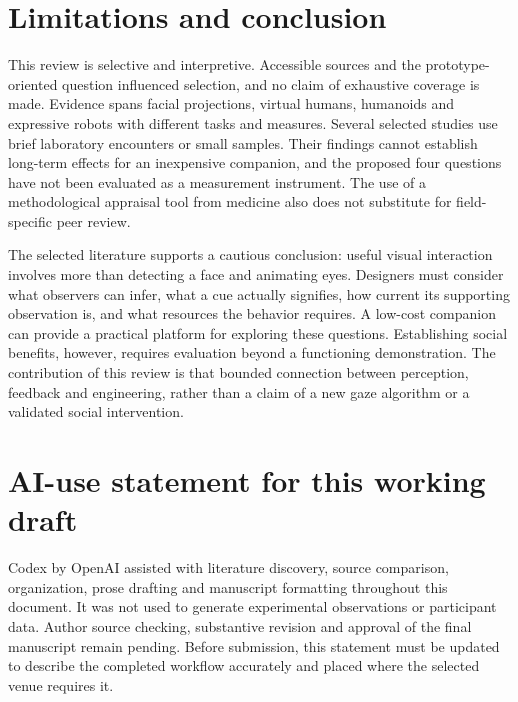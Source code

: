 \documentclass[11pt,a4paper]{article}
\begin{document}
\section{Limitations and conclusion}

This review is selective and interpretive. Accessible sources and the prototype-oriented question influenced selection, and no claim of exhaustive coverage is made. Evidence spans facial projections, virtual humans, humanoids and expressive robots with different tasks and measures. Several selected studies use brief laboratory encounters or small samples. Their findings cannot establish long-term effects for an inexpensive companion, and the proposed four questions have not been evaluated as a measurement instrument. The use of a methodological appraisal tool from medicine also does not substitute for field-specific peer review.

The selected literature supports a cautious conclusion: useful visual interaction involves more than detecting a face and animating eyes. Designers must consider what observers can infer, what a cue actually signifies, how current its supporting observation is, and what resources the behavior requires. A low-cost companion can provide a practical platform for exploring these questions. Establishing social benefits, however, requires evaluation beyond a functioning demonstration. The contribution of this review is that bounded connection between perception, feedback and engineering, rather than a claim of a new gaze algorithm or a validated social intervention.

\section*{AI-use statement for this working draft}

Codex by OpenAI assisted with literature discovery, source comparison, organization, prose drafting and manuscript formatting throughout this document. It was not used to generate experimental observations or participant data. Author source checking, substantive revision and approval of the final manuscript remain pending. Before submission, this statement must be updated to describe the completed workflow accurately and placed where the selected venue requires it.
\end{document}
